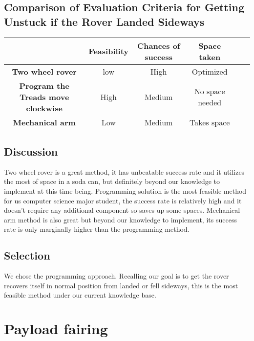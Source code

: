\documentclass[10pt,letterpaper,onecolumn,journal]{IEEEtran}
\begin{document}
\subsection*{Comparison of Evaluation Criteria for Getting Unstuck if the Rover Landed Sideways}
\begin{center}
  \begin{tabular}{cccccc}
    \hline
    \multicolumn{1}{l}{} & \textbf{Feasibility} & \textbf{Chances of success}    & \textbf{Space taken} \\
		\hline
		\textbf{Two wheel rover}        				 & low         &  High                & Optimized \\
		\hline
		\textbf{Program the Treads move clockwise}    & High        & Medium		          &  No space needed \\
		\hline
		\textbf{Mechanical arm} 						 & Low         & Medium	              &  Takes space  \\
                \hline
	\end{tabular}
\end{center}
\vspace{.3cm}

\subsection{Discussion}
Two wheel rover is a great method, it has unbeatable success rate and it utilizes the most of space in a soda can, but definitely beyond our knowledge to implement at this time being. Programming solution is the most feasible method for us computer science major student, the success rate is relatively high and it doesn't require any additional component so saves up some spaces. Mechanical arm method is also great but beyond our knowledge to implement, its success rate is only marginally higher than the programming method. 

\subsection{Selection}
We chose the programming approach. Recalling our goal is to get the rover recovers itself in normal position from landed or fell sideways, this is the most feasible method under our current knowledge base. 

\section{Payload fairing}
\end{document}
